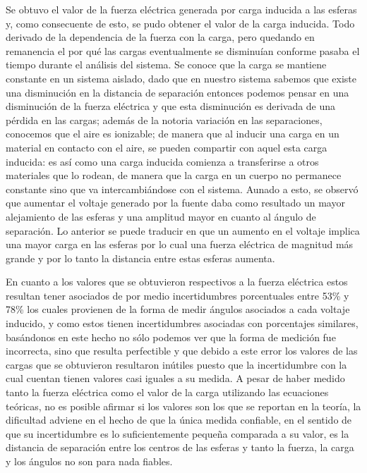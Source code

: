 \documentclass[letterpaper, 11 pt]{article}
\begin{document}
\begin{multicols*}{2}
Se obtuvo el valor de la fuerza eléctrica generada por carga inducida a las esferas y, como consecuente de esto, se pudo obtener el valor de la carga inducida. Todo derivado de la dependencia de la fuerza con la carga, pero quedando en remanencia el por qué las cargas eventualmente se disminuían conforme pasaba el tiempo durante el análisis del sistema. Se conoce que la carga se mantiene constante en un sistema aislado, dado que en nuestro sistema sabemos que existe una disminución en la distancia de separación entonces podemos pensar en una disminución de la fuerza eléctrica y que esta disminución es derivada de una pérdida en las cargas; además de la notoria variación en las separaciones, conocemos que el aire es ionizable; de manera que al inducir una carga en un material en contacto con el aire, se pueden compartir con aquel esta carga inducida: es así como una carga inducida comienza a transferirse a otros materiales que lo rodean, de manera que la carga en un cuerpo no permanece constante sino que va intercambiándose con el sistema.
Aunado a esto, se observó que aumentar el voltaje generado por la fuente daba como resultado un mayor alejamiento de las esferas y una amplitud mayor en cuanto al ángulo de separación. Lo anterior se puede traducir en que un aumento en el voltaje implica una mayor carga en las esferas por lo cual una fuerza eléctrica de magnitud más grande y por lo tanto la distancia entre estas esferas aumenta.

En cuanto a los valores que se obtuvieron respectivos a la fuerza eléctrica estos resultan tener asociados de por medio incertidumbres porcentuales entre 53\% y 78\% los cuales provienen de la forma de medir ángulos asociados a cada voltaje inducido, y como estos tienen incertidumbres asociadas con porcentajes similares, basándonos en este hecho no sólo podemos ver que la forma de medición fue incorrecta, sino que resulta perfectible y que debido a este error los valores de las cargas que se obtuvieron resultaron inútiles puesto que la incertidumbre con la cual cuentan tienen valores casi iguales a su medida. A pesar de haber medido tanto la fuerza eléctrica como el valor de la carga utilizando las ecuaciones teóricas, no es posible afirmar si los valores son los que se reportan en la teoría, la dificultad adviene en el hecho de que la única medida confiable, en el sentido de que su incertidumbre es lo suficientemente pequeña comparada a su valor, es la distancia de separación entre los centros de las esferas y tanto la fuerza, la carga y los ángulos no son para nada fiables.






\end{multicols*}
\end{document}

